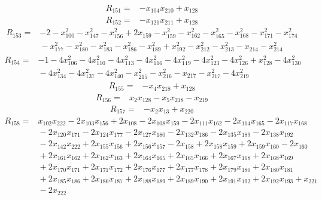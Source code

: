 \begin{align*}
R_{151}={}& -x_{104}x_{210} + x_{128}
\end{align*}
\begin{align*}
R_{152}={}& -x_{121}x_{211} + x_{128}
\end{align*}
\begin{align*}
R_{153}={}& -2 - x_{100}^{2} - x_{147}^{2} - x_{156}^{2} + 2x_{159} - x_{159}^{2} - x_{162}^{2} - x_{165}^{2} - x_{168}^{2} - x_{171}^{2} - x_{174}^{2} \\
&{} - x_{177}^{2} - x_{180}^{2} - x_{183}^{2} - x_{186}^{2} - x_{189}^{2} + x_{192}^{2} - x_{212}^{2} - x_{213}^{2} - x_{214} - x_{214}^{2}
\end{align*}
\begin{align*}
R_{154}={}& -1 - 4x_{106}^{2} - 4x_{110}^{2} - 4x_{113}^{2} - 4x_{116}^{2} - 4x_{119}^{2} - 4x_{123}^{2} - 4x_{126}^{2} + x_{128}^{2} - 4x_{130}^{2} \\
&{} - 4x_{134}^{2} - 4x_{137}^{2} - 4x_{140}^{2} - x_{215}^{2} - x_{216}^{2} - x_{217} - x_{217}^{2} - 4x_{219}^{2}
\end{align*}
\begin{align*}
R_{155}={}& -x_{4}x_{218} + x_{128}
\end{align*}
\begin{align*}
R_{156}={}& x_{2}x_{128} - x_{5}x_{218} - x_{219}
\end{align*}
\begin{align*}
R_{157}={}& -x_{2}x_{13} + x_{220}
\end{align*}
\begin{align*}
R_{158}={}& x_{102}x_{222} - 2x_{103}x_{156} + 2x_{108} - 2x_{108}x_{159} - 2x_{111}x_{162} - 2x_{114}x_{165} - 2x_{117}x_{168} \\
&{} - 2x_{120}x_{171} - 2x_{124}x_{177} - 2x_{127}x_{180} - 2x_{132}x_{186} - 2x_{135}x_{189} - 2x_{138}x_{192} \\
&{} - 2x_{142}x_{222} + 2x_{155}x_{156} + 2x_{156}x_{157} - 2x_{158} + 2x_{158}x_{159} + 2x_{159}x_{160} - 2x_{160} \\
&{} + 2x_{161}x_{162} + 2x_{162}x_{163} + 2x_{164}x_{165} + 2x_{165}x_{166} + 2x_{167}x_{168} + 2x_{168}x_{169} \\
&{} + 2x_{170}x_{171} + 2x_{171}x_{172} + 2x_{176}x_{177} + 2x_{177}x_{178} + 2x_{179}x_{180} + 2x_{180}x_{181} \\
&{} + 2x_{185}x_{186} + 2x_{186}x_{187} + 2x_{188}x_{189} + 2x_{189}x_{190} + 2x_{191}x_{192} + 2x_{192}x_{193} + x_{221} \\
&{} - 2x_{222}
\end{align*}
